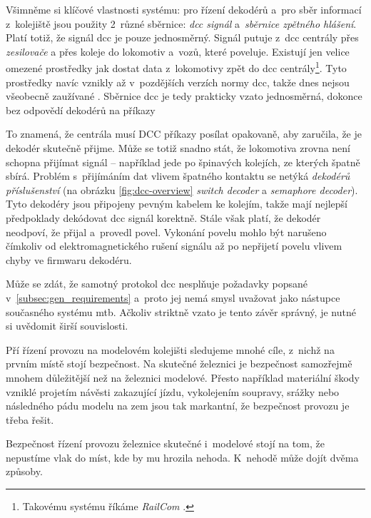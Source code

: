 Všimněme si klíčové vlastnosti systému: pro řízení dekodérů
a~pro sběr informací z~kolejiště jsou použity 2~různé sběrnice: \textit{dcc
signál} a~\textit{sběrnice zpětného hlášení}. Platí totiž, že signál \gls{dcc}
je pouze jednosměrný. Signál putuje z~\gls{dcc} centrály přes
\textit{zesilovače} a přes koleje do lokomotiv a~vozů, které poveluje.
Existují jen velice omezené prostředky jak dostat data z~lokomotivy zpět do
\gls{dcc} centrály\footnote{Takovému systému říkáme \textit{RailCom}
\cite{railcom:web}.}. Tyto prostředky navíc vznikly až v~pozdějších verzích
normy \gls{dcc}, takže dnes nejsou všeobecně zaužívané \cite{railcom:web}.
Sběrnice \gls{dcc} je tedy prakticky vzato jednosměrná, dokonce bez odpovědí
dekodérů na příkazy

To znamená, že centrála musí DCC příkazy posílat opakovaně, aby zaručila, že je
dekodér skutečně přijme. Může se totiž snadno stát, že lokomotiva zrovna není
schopna přijímat signál – například jede po špinavých kolejích, ze kterých
špatně sbírá. Problém s~přijímáním dat vlivem špatného kontaktu se netýká
\textit{dekodérů příslušenství} (na obrázku \ref{fig:dcc-overview}
\textit{switch decoder} a \textit{semaphore decoder}).  Tyto dekodéry jsou
připojeny pevným kabelem ke kolejím, takže mají nejlepší předpoklady dekódovat
\gls{dcc} signál korektně. Stále však platí, že dekodér neodpoví, že přijal
a~provedl povel. Vykonání povelu mohlo být narušeno čímkoliv od
elektromagnetického rušení signálu až po nepřijetí povelu vlivem chyby ve
firmwaru dekodéru.

Může se zdát, že samotný protokol \gls{dcc} nesplňuje požadavky popsané
v~\ref{subsec:gen_requirements} a~proto jej nemá smysl uvažovat jako nástupce
současného systému \gls{mtb}. Ačkoliv striktně vzato je tento závěr
správný, je nutné si uvědomit širší souvislosti.

Pří řízení provozu na modelovém kolejišti sledujeme mnohé cíle, z~nichž na
prvním místě stojí bezpečnost. Na skutečné železnici je bezpečnost samozřejmě
mnohem důležitější než na železnici modelové. Přesto například materiální škody
vzniklé projetím návěsti zakazující jízdu, vykolejením soupravy, srážky nebo
následného pádu modelu na zem jsou tak markantní, že bezpečnost provozu je
třeba řešit.

Bezpečnost řízení provozu železnice skutečné i~modelové stojí na tom, že
nepustíme vlak do míst, kde by mu hrozila nehoda. K~nehodě může dojít dvěma
způsoby.

